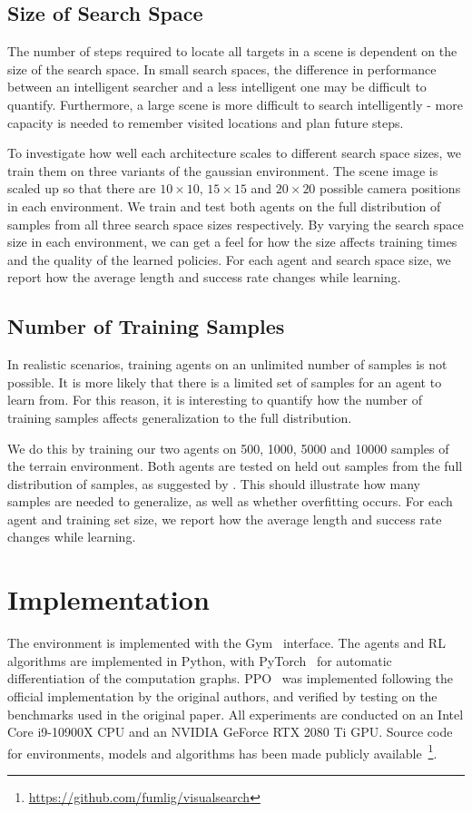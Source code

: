 \subsection{Size of Search Space}

The number of steps required to locate all targets in a scene is dependent on the size of the search space.
In small search spaces, the difference in performance between an intelligent searcher and a less intelligent one may be difficult to quantify.
Furthermore, a large scene is more difficult to search intelligently - more capacity is needed to remember visited locations and plan future steps.

To investigate how well each architecture scales to different search space sizes, we train them on three variants of the gaussian environment.
The scene image is scaled up so that there are \(10 \times 10\), \(15 \times 15\) and \(20 \times 20\) possible camera positions in each environment.
We train and test both agents on the full distribution of samples from all three search space sizes respectively.
By varying the search space size in each environment, we can get a feel for how the size affects training times and the quality of the learned policies.
For each agent and search space size, we report how the average length and success rate changes while learning.

\subsection{Number of Training Samples}

In realistic scenarios, training agents on an unlimited number of samples is not possible.
It is more likely that there is a limited set of samples for an agent to learn from.
For this reason, it is interesting to quantify how the number of training samples affects generalization to the full distribution.

We do this by training our two agents on 500, 1000, 5000 and 10000 samples of the terrain environment.
Both agents are tested on held out samples from the full distribution of samples, as suggested by \cite{cobbe_leveraging_2020}.
This should illustrate how many samples are needed to generalize, as well as whether overfitting occurs.
For each agent and training set size, we report how the average length and success rate changes while learning.

\section{Implementation}

The environment is implemented with the Gym~\cite{brockman_openai_2016} interface.
The agents and RL algorithms are implemented in Python, with PyTorch~\cite{paszke_pytorch_2019} for automatic differentiation of the computation graphs.
PPO~\cite{schulman_proximal_2017} was implemented following the official implementation by the original authors,
and verified by testing on the benchmarks used in the original paper.
All experiments are conducted on an Intel Core i9-10900X CPU and an NVIDIA GeForce RTX 2080 Ti GPU.
Source code for environments, models and algorithms has been made publicly available~\footnote{\url{https://github.com/fumlig/visualsearch}}.
